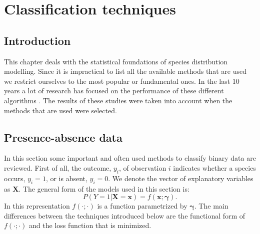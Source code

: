 \chapter{Classification techniques}
\label{ch:ClassificationTechniques}

\section{Introduction}
This chapter deals with the statistical foundations of species distribution modelling. Since it is impractical to list all the available methods that are used we restrict ourselves to the most popular or fundamental ones. In the last 10 years a lot of research has focused on the performance of these different algorithms \parencite[e.g.][]{elith*_novel_2006,segurado_evaluation_2004}. The results of these studies were taken into account when the methods that are used were selected.

\section{Presence-absence data}
\label{sec:PresenceAbsenceData}

In this section some important and often used methods to classify binary data are reviewed. First of all, the outcome, $y_i$, of observation $i$ indicates whether a species occurs, $y_i = 1$, or is absent, $y_i=0$. We denote the vector of explanatory variables as $\bm{X}$. The general form of the models used in this section is:
\begin{equation}
\label{FundEq}
P(Y=1|\bm{X} = \bm{x}) = f(\bm{x}; \bm{\gamma}).
\end{equation}
In this representation $f(\cdot;\cdot)$ is a function parametrized by $\bm{\gamma}$. The main differences between the techniques introduced below are the functional form of $f(\cdot;\cdot)$ and the loss function that is minimized.

